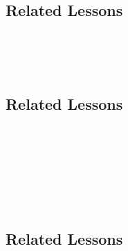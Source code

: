 \subsection{Related Lessons}
\fourgSeven{}\\
\fourkNine{}\\
\fourkTen{}\\
%
\subsection{Related Lessons}
\fourhOne{}\\
\fourjOne{}\\
\fourkThree{}\\
\fourkFour{}\\
\fourkSix{}\\
\fourkEight{}\\
%
\subsection{Related Lessons}
\fourhThree{}\\
\fourhFour{}\\
\fourkTwo{}\\
\fourkThree{}\\
\fourkFour{}\\
